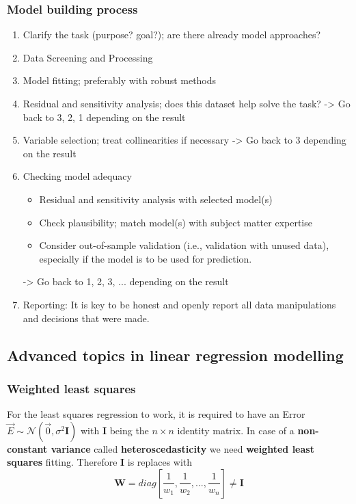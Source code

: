 \subsubsection{Model building process}

\begin{enumerate}
	\tightlist
	\item Clarify the task (purpose? goal?); are there already model approaches?
	\item Data Screening and Processing
	\item Model fitting; preferably with robust methods
	\item Residual and sensitivity analysis; does this dataset help solve the task? -> Go back to 3, 2, 1 depending on the result
	\item Variable selection; treat collinearities if necessary -> Go back to 3 depending on the result
	\item Checking model adequacy
	\begin{itemize}
		\tightlist
		\item Residual and sensitivity analysis with selected model(s)
		\item Check plausibility; match model(s) with subject matter expertise
		\item Consider out-of-sample validation (i.e., validation with unused data), especially if the model is to be used for prediction.
	\end{itemize}
	-> Go back to 1, 2, 3, ... depending on the result
	\item Reporting: It is key to be honest and openly report all data manipulations and decisions that were made.
\end{enumerate}

\subsection{Advanced topics in linear regression modelling}

\subsubsection{Weighted least squares}

For the least squares regression to work, it is required to have an Error $\vec{E} \sim \mathcal{N}(\vec{0}, \sigma^2\bm{I})$ with $\bm{I}$ being the $n\times n$ identity matrix. In case of a \textbf{non-constant variance} called \textbf{heteroscedasticity} we need \textbf{weighted least squares} fitting. Therefore $\bm{I}$ is replaces with
\begin{equation*}
\bm{W}=diag[\frac{1}{w_1},\frac{1}{w_2}, ..., \frac{1}{w_n}] \neq \bm{I}
\end{equation*}

